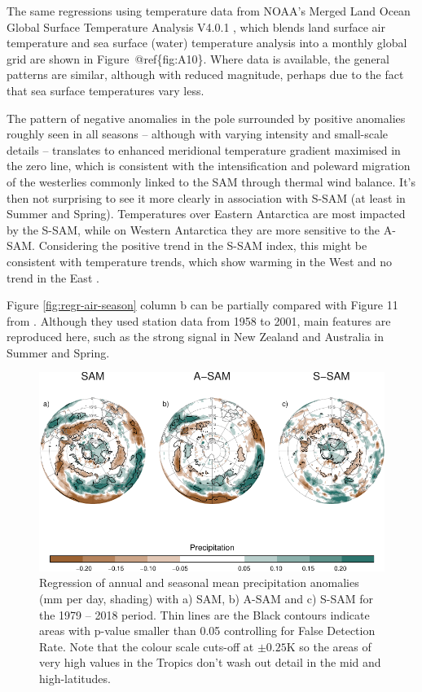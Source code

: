 \documentclass[smallextended]{svjour3}       %
\begin{document}
The same regressions using temperature data from NOAA's Merged Land Ocean Global Surface Temperature Analysis V4.0.1 \citep{smith2008, vose2012}, which blends land surface air temperature and sea surface (water) temperature analysis into a monthly global grid are shown in Figure~@ref\{fig:A10\}.
Where data is available, the general patterns are similar, although with reduced magnitude, perhaps due to the fact that sea surface temperatures vary less.

The pattern of negative anomalies in the pole surrounded by positive anomalies roughly seen in all seasons -- although with varying intensity and small-scale details -- translates to enhanced meridional temperature gradient maximised in the zero line, which is consistent with the intensification and poleward migration of the westerlies commonly linked to the SAM through thermal wind balance.
It's then not surprising to see it more clearly in association with S\nobreakdash-SAM (at least in Summer and Spring).
Temperatures over Eastern Antarctica are most impacted by the S\nobreakdash-SAM, while on Western Antarctica they are more sensitive to the A\nobreakdash-SAM.
Considering the positive trend in the S\nobreakdash-SAM index, this might be consistent with temperature trends, which show warming in the West and no trend in the East \citep{nicolas2014}.

Figure \ref{fig:regr-air-season} column b can be partially compared with Figure 11 from \citet{fogt2012}.
Although they used station data from 1958 to 2001, main features are reproduced here, such as the strong signal in New Zealand and Australia in Summer and Spring.



\begin{figure}
\includegraphics{global-pp-1} \caption{Regression of annual and seasonal mean precipitation anomalies (mm per day, shading) with a) SAM, b) A\nobreakdash-SAM and c) S\nobreakdash-SAM for the 1979 -- 2018 period. Thin lines are the Black contours indicate areas with p-value smaller than 0.05 controlling for False Detection Rate. Note that the colour scale cuts-off at \(\pm0.25 \mathrm{K}\) so the areas of very high values in the Tropics don't wash out detail in the mid and high-latitudes.}\label{fig:global-pp}
\end{figure}
\end{document}
